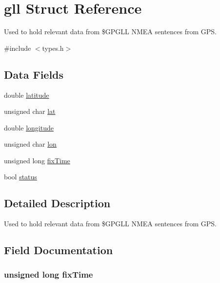 \hypertarget{structgll}{}\section{gll Struct Reference}
\label{structgll}


Used to hold relevant data from \$\+G\+P\+G\+LL N\+M\+EA sentences from G\+PS.  




{\ttfamily \#include $<$types.\+h$>$}

\subsection*{Data Fields}
\begin{DoxyCompactItemize}
\item 
double \hyperlink{structgll_a76714bdbc5c536fa77dfb14533ff82a9}{latitude}
\item 
unsigned char \hyperlink{structgll_a6a2e4ad53afd61fcd716002fc2965220}{lat}
\item 
double \hyperlink{structgll_ac155e35fdeebafc89723a51520fb9fe6}{longitude}
\item 
unsigned char \hyperlink{structgll_a7e55b80071251dcef4239e60122980a4}{lon}
\item 
unsigned long \hyperlink{structgll_ac80d42f9b62a236bcb13ea2320515359}{fix\+Time}
\item 
bool \hyperlink{structgll_ad1f0bff7112206922c9d5a87adad6f2b}{status}
\end{DoxyCompactItemize}


\subsection{Detailed Description}
Used to hold relevant data from \$\+G\+P\+G\+LL N\+M\+EA sentences from G\+PS. 

\subsection{Field Documentation}
\subsubsection[{\texorpdfstring{fix\+Time}{fixTime}}]{\setlength{\rightskip}{0pt plus 5cm}unsigned long fix\+Time}\hypertarget{structgll_ac80d42f9b62a236bcb13ea2320515359}{}\label{structgll_ac80d42f9b62a236bcb13ea2320515359}

